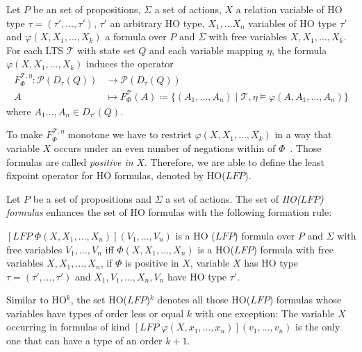 \begin{definition}
\label{definition:induced_operator}
    Let $P$ be an set of propositions, $\Sigma$ a set of actions, $X$ a relation variable of HO type $\tau = (\tau', \dots, \tau')$,
    $\tau'$ an arbitrary HO type, $X_1, \dots X_n$ variables of HO type $\tau'$ and $\varphi(X, X_1, \dots, X_k)$ a
    formula over $P$ and $\Sigma$ with free variables $X, X_1, \dots, X_k$. For each LTS $\mathcal{T}$ with
    state set $Q$ and each variable mapping $\eta$, the formula $\varphi(X, X_1, \dots, X_k)$ induces the operator
    \begin{align*}
        F_\Phi^{\mathcal{T},\eta}\colon\mathscr{P}(D_\tau(Q)) &\longrightarrow \mathscr{P}(D_\tau(Q))\\
        A &\longmapsto F_\Phi^\mathcal{T}(A) \coloneqq \{(A_1, \dots, A_n) \mid \mathcal{T}, \eta \models \varphi(A, A_1,
        \dots, A_n)\}
    \end{align*}
    where $A_1 \dots, A_n \in D_{\tau'}(Q)$.
\end{definition}

To make $F_\Phi^{\mathcal{T}, \eta}$ monotone we have to restrict $\varphi(X, X_1, \dots, X_k)$ in a way that variable
$X$ occurs under an even number of negations within of $\Phi$~\cite{freireMartins2011descriptive}. Those formulas
are called \textit{positive in} $X$. Therefore, we are able to define the least fixpoint operator for HO
formulas, denoted by HO($\mathit{LFP}$).

\begin{definition}
    Let $P$ be a set of propositions and $\Sigma$ a set of actions. The set of \emph{HO($\mathit{LFP}$) formulas} enhances the set of HO formulas with the
    following formation rule:
    \begin{compactitem}
        \item $[\mathit{LFP}\;\Phi(X, X_1, \dots, X_n)](V_1, \dots, V_n)$ is a HO
        ($\mathit{LFP}$) formula over $P$ and $\Sigma$ with free variables $V_1, \dots, V_n$ iff $\Phi(X, X_1, \dots, X_n)
        $ is a HO($\mathit{LFP}$) formula with free variables $X, X_1, \dots, X_n$, if $\Phi$ is positive in
        $X$, variable $X$ has HO type $\tau = (\tau', \dots, \tau')$ and $X_1, V_1, \dots, X_n, V_n$ have HO type $\tau'$.
    \end{compactitem}
\end{definition}

Similar to HO$^k$, the set HO($\mathit{LFP}$)$^k$ denotes all those HO($\mathit{LFP}$) formulas whose variables have types of
order less or equal $k$ with one exception: The variable $X$ occurring in formulas of kind $[\mathit{LFP}\;\varphi(X, x_1, \dots, x_n)](v_1, \dots, v_n)$ is the only one that can have a type of an order $k+1$.


